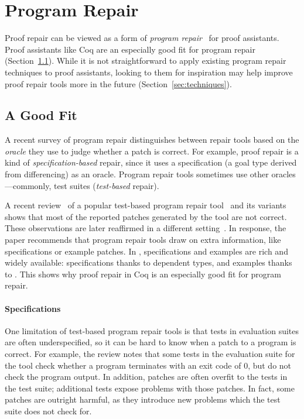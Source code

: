 \section{Program Repair}
\label{sec:repair}

Proof repair can be viewed as a form of \textit{program repair}~\cite{Monperrus:2018:ASR:3177787.3105906, Gazzola:2018:ASR:3180155.3182526}
for proof assistants. %
Proof assistants like Coq are an especially good fit for program repair (Section~\ref{sec:lessons}).
While it is not straightforward to apply existing program repair techniques to proof assistants,
looking to them for inspiration may help improve proof repair tools more in the future (Section~\ref{sec:techniques}).

\subsection{A Good Fit}
\label{sec:lessons}

A recent survey of program repair distinguishes between repair tools based on the \textit{oracle} they use to
judge whether a patch is correct.
For example, proof repair is a kind of \textit{specification-based} repair,
since it uses a specification (a goal type derived from differencing) as an oracle.
Program repair tools sometimes use other oracles---commonly, test suites (\textit{test-based} repair).

A recent review~\cite{Qi:2015:APP:2771783.2771791} of a popular test-based program repair tool~\cite{LeGoues:2012:SSA:2337223.2337225} and its variants
shows that most of the reported patches generated by the tool are not correct.
These observations are later reaffirmed in a different setting~\cite{DBLP:journals/corr/abs-1811-02429}.
In response, the paper recommends that program repair tools draw on extra information, like specifications or example patches.
In , specifications and examples are rich and widely available: specifications thanks to dependent types,
and examples thanks to . This shows why proof repair in Coq is an especially good fit for program repair.
 
\paragraph{Specifications}
One limitation of test-based program repair tools is that tests in evaluation suites are often underspecified,
so it can be hard to know when a patch to a program is correct.
For example, the review notes that some tests in the evaluation suite for the tool check whether a program terminates with an exit code of 0, 
but do not check the program output.
In addition, patches are often overfit to the tests in the test suite; additional tests expose problems with those patches.
In fact, some patches are outright harmful, as they introduce new problems which the test suite does not check for.


